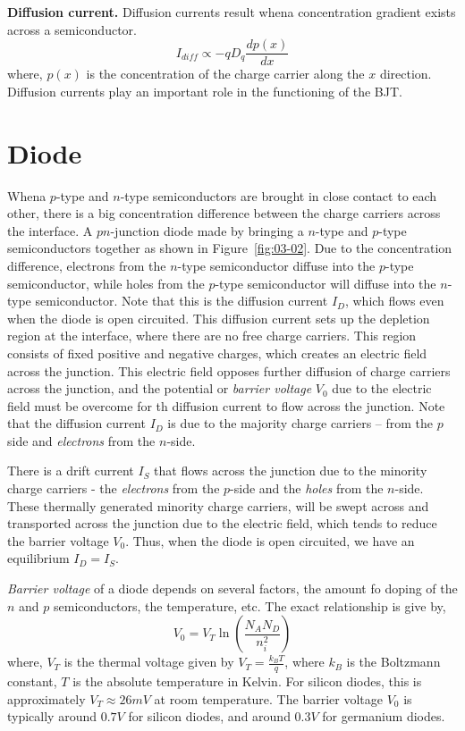 \noindent\textbf{Diffusion current.} Diffusion currents result whena concentration gradient exists across a semiconductor.
\begin{equation}
    I_{diff} \propto -q D_q \frac{d p\left(x\right)}{dx}
    \label{eq:ch03-diff-current}
\end{equation}
where, $p\left(x\right)$ is the concentration of the charge carrier along the $x$ direction. Diffusion currents play an important role in the functioning of the BJT.

\section{Diode}
Whena  $p$-type and $n$-type semiconductors are brought in close contact to each other, there is a big concentration difference between the charge carriers across the interface. A $pn$-junction diode made by bringing a $n$-type and $p$-type semiconductors together as shown in Figure~\ref{fig:03-02}. Due to the concentration difference, electrons from the $n$-type semiconductor diffuse into the $p$-type semiconductor, while holes from the $p$-type semiconductor will diffuse into the $n$-type semiconductor. Note that this is the diffusion current $I_D$, which flows even when the diode is open circuited. This diffusion current sets up the depletion region at the interface, where there are no free charge carriers. This region consists of fixed positive and negative charges, which creates an electric field across the junction. This electric field opposes further diffusion of charge carriers across the junction, and the potential or \textit{barrier voltage} $V_0$ due to the electric field must be overcome for th diffusion current to flow across the junction. Note that the diffusion current $I_D$ is due to the majority charge carriers --  from the $p$ side and \textit{electrons} from the $n$-side.

There is a drift current $I_S$ that flows across the junction due to the minority charge carriers - the \textit{electrons} from the $p$-side and the \textit{holes} from the $n$-side. These thermally generated minority charge carriers, will be swept across and transported across the junction due to the electric field, which tends to reduce the barrier voltage $V_0$. Thus, when the diode is open circuited, we have an equilibrium $I_D = I_S$.

\noindent\textit{Barrier voltage} of a diode depends on several factors, the amount fo doping of the $n$ and $p$ semiconductors, the temperature, etc. The exact relationship is give by,
\begin{equation}
    V_0 = V_T \ln\left(\frac{N_A N_D}{n_i^2}\right)
    \label{eq:ch03-barrier-volt}
\end{equation}
where, $V_T$ is the thermal voltage given by $V_T = \frac{k_B T}{q}$, where $k_B$ is the Boltzmann constant, $T$ is the absolute temperature in Kelvin. For silicon diodes, this is approximately $V_T \approx 26 mV$ at room temperature. The barrier voltage $V_0$ is typically around $0.7 V$ for silicon diodes, and around $0.3 V$ for germanium diodes.

